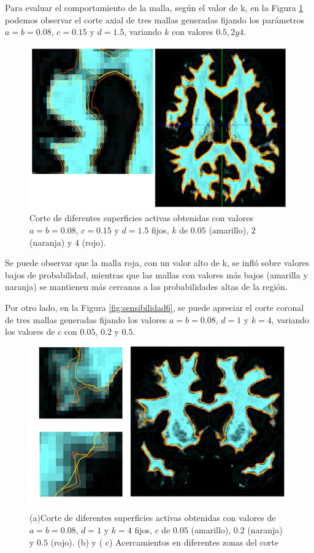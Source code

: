 Para evaluar el comportamiento de la malla, según el valor de k, en la Figura \ref{fig:sensibilidad8} podemos observar el corte axial de tres mallas generadas fijando los parámetros $a=b=0.08$, $c=0.15$ y $d=1.5$, variando $k$ con valores $0.5, 2 y 4$.

\begin{figure}[h!]
	\centering
	\includegraphics[scale=0.05]{images/sensibilidad8.jpg}
	\caption{Corte de diferentes superficies activas obtenidas con valores $a=b=0.08$, $c=0.15$ y $d=1.5$ fijos,  $k$ de $0.05$ (amarillo), $2$ (naranja) y $4$ (rojo). }
	\label{fig:sensibilidad8}
\end{figure}

Se puede observar que la malla roja, con un valor alto de k, se infló sobre valores bajos de probabilidad, mientras que las mallas con valores más bajos (amarilla y naranja) se mantienen más cercanas a las probabilidades altas de la región.

Por otro lado, en la Figura \ref{fig:sensibilidad6}, se puede apreciar el corte coronal de tres mallas generadas fijando los valores $a=b=0.08$, $d=1$ y $k=4$,  variando los valores de $c$ con $0.05$, $0.2$ y $0.5$.

\begin{figure}[h!]
	\centering
	\includegraphics[scale=0.05]{images/sensibilidad9.jpg}
	\caption{(a)Corte de diferentes superficies activas obtenidas con valores de $a=b=0.08$, $d=1$ y $k=4$ fijos, $c$ de $0.05$ (amarillo), $0.2$ (naranja) y $0.5$ (rojo). (b) y ( c) Acercamientos en diferentes zonas del corte}
	\label{fig:sensibilidad9}
\end{figure}

